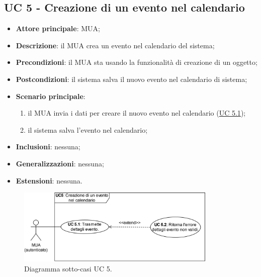 \subsection{UC 5 - Creazione di un evento nel calendario} \label{sec:UC5}
    \begin{itemize}
        \item \textbf{Attore principale}: MUA;
        \item \textbf{Descrizione}: il MUA crea un evento nel calendario del sistema;
        \item \textbf{Precondizioni}: il MUA sta usando la funzionalità di creazione di un oggetto;
        \item \textbf{Postcondizioni}: il sistema salva il nuovo evento nel calendario di sistema;
        \item \textbf{Scenario principale}:
            \begin{enumerate}
                \item il MUA invia i dati per creare il nuovo evento nel calendario (\hyperref[sec:UC5.1]{UC 5.1});
                \item il sistema salva l'evento nel calendario;
            \end{enumerate}
        \item \textbf{Inclusioni}: nessuna;
        \item \textbf{Generalizzazioni}: nessuna;
        \item \textbf{Estensioni}: nessuna.
    \end{itemize}

\begin{figure}[h]
    \includegraphics[width=0.85\textwidth]{sections/uc_imgs/UC05.X.png}
    \centering
    \caption{Diagramma sotto-casi UC 5.}
\end{figure}

